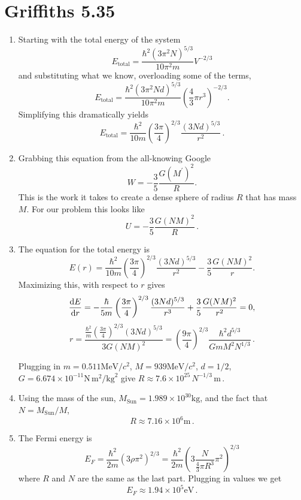 \documentclass[11pt]{article}
\begin{document}
\section*{Griffiths 5.35}
\begin{enumerate}[label=\alph*)]
\item Starting with the total energy of the system
\[E_{\text{total}} = \frac{\hbar^2 \left(3\pi^2 N\right)^{5/3}}{10\pi^2 m}V^{-2/3}\]
and substituting what we know, overloading some of the terms, 
\[E_{\text{total}} = \frac{\hbar^2 \left(3\pi^2 Nd\right)^{5/3}}{10\pi^2 m}\left(\frac{4}{3}\pi r^3\right)^{-2/3}.\]
Simplifying this dramatically yields
\[\boxed{E_{\text{total}} = \frac{\hbar^2}{10m}\left(\frac{3\pi}{4}\right)^{2/3} \frac{(3Nd)^{5/3}}{r^2}} \, .\]

\item Grabbing this equation from the all-knowing Google
\[W = - \frac{3}{5}\frac{G\left(M^\prime\right)^2}{R}.\]
This is the work it takes to create a dense sphere of radius $R$ that has mass $M$. For our problem this looks like 
\[\boxed{U = -\frac{3}{5}\frac{G(NM)^2}{R}}\,.\]

\item The equation for the total energy is
\[E(r) = \frac{\hbar^2}{10m}\left(\frac{3\pi}{4}\right)^{2/3} \frac{(3Nd)^{5/3}}{r^2} - \frac{3}{5}\frac{G(NM)^2}{r}.\]
Maximizing this, with respect to $r$ gives
\[ \dv{E}{r}  = -\frac{\hbar}{5m}\left(\frac{3\pi}{4}\right)^{2/3}\frac{(3Nd)^{5/3}}{r^3} + \frac{3}{5}\frac{G(NM)^2}{r^2} = 0, \]
\[r  = \frac{\frac{\hbar^2}{m}\left(\frac{3\pi}{4}\right)^{2/3}(3Nd)^{5/3}}{3G(NM)^2} = \boxed{ \left(\frac{9\pi}{4}\right)^{2/3} \frac{\hbar^2 d^{5/3}}{GmM^2N^{1/3}}}\, .\]

Plugging in $m = 0.511 \text{MeV}/c^2$, $M = 939 \text{MeV}/c^2$, $d = 1/2$, $G = 6.674 \times 10^{-11} \text{N} \, \text{m}^2 / \text{kg}^2$ give $\displaystyle{\boxed{R \approx 7.6 \times 10^{25} \, N^{-1/3} \, \text{m}}}\, .$

\item Using the mass of the sun, $M_\text{Sun} = 1.989\times 10^{30} \text{kg}$, and the fact that $N = M_\text{Sun}/M$, 
\[\boxed{R \approx 7.16 \times 10^6 \text{m}}\, .\]

\item The Fermi energy is 
\[E_F = \frac{\hbar^2}{2m}\left(3 \rho \pi^2\right)^{2/3} = \frac{\hbar^2}{2m}\left(3 \frac{N}{\frac{4}{3}\pi R^3}\pi^2\right)^{2/3}\]
where $R$ and $N$ are the same as the last part. Plugging in values we get
\[\boxed{E_F \approx 1.94\times 10^5 \text{eV}} \, .\]

\end{enumerate}
\end{document}
